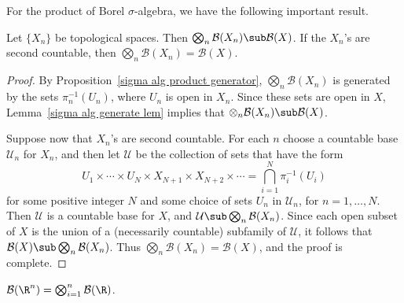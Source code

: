 For the product of Borel $\sigma$-algebra, we have the following important result.
\begin{proposition}\label{product Borel algebra equal if C_2}
Let $\{X_n\}$ be topological spaces. Then $\bigotimes_{n}\mathcal{B}(X_n)\sub\mathcal{B}(X)$. If the $X_n$'s are second countable, then $\bigotimes_{n}\mathcal{B}(X_n)=\mathcal{B}(X)$.
\end{proposition}
\begin{proof}
By Proposition~\ref{sigma alg product generator}, $\bigotimes_{n}\mathcal{B}(X_n)$ is generated by the sets $\pi_n^{-1}(U_n)$, where $U_n$ is open in $X_n$. Since these sets are open in $X$, Lemma~\ref{sigma alg generate lem} implies that $\otimes_{n}\mathcal{B}(X_n)\sub\mathcal{B}(X)$.\par
Suppose now that $X_n$'s are second countable. For each $n$ choose a countable base $\mathcal{U}_n$ for $X_n$, and then let $\mathcal{U}$ be the collection of sets that have the form
\[U_1\times\cdots\times U_N\times X_{N+1}\times X_{N+2}\times\cdots=\bigcap_{i=1}^{N}\pi_{i}^{-1}(U_i)\]
for some positive integer $N$ and some choice of sets $U_n$ in $\mathcal{U}_n$, for $n=1,\dots,N$. Then $\mathcal{U}$ is a countable base for $X$, and $\mathcal{U}\sub\bigotimes_n\mathcal{B}(X_n)$. Since each open subset
of $X$ is the union of a (necessarily countable) subfamily of $\mathcal{U}$, it follows that $\mathcal{B}(X)\sub\bigotimes_n\mathcal{B}(X_n)$. Thus $\bigotimes_{n}\mathcal{B}(X_n)=\mathcal{B}(X)$, and the proof is complete.
\end{proof}
\begin{corollary}
$\mathcal{B}(\R^n)=\bigotimes_{i=1}^{n}\mathcal{B}(\R)$.
\end{corollary}
